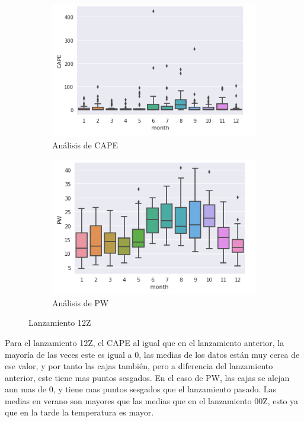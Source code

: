 \documentclass[12pt]{article}
\begin{document}
\begin{figure}[h!]
\begin{subfigure}{.55\textwidth}
  \centering
  \includegraphics[width=.8\linewidth]{CAPE_mes_12Z.png}
  \caption{Análisis de CAPE}
  \label{fig:sfig1}
\end{subfigure}
\begin{subfigure}{.55\textwidth}
  \centering
  \includegraphics[width=.8\linewidth]{PW_mes_12Z.png}
  \caption{Análisis de PW}
  \label{fig:sfig2}
\end{subfigure}
\caption{Lanzamiento 12Z}
\end{figure}

Para el lanzamiento 12Z, el CAPE al igual que en el lanzamiento anterior, la mayoría de las veces este es igual a 0, las medias de los datos están muy cerca de ese valor, y por tanto las cajas también, pero a diferencia del lanzamiento anterior, este tiene mas puntos sesgados. En el caso de PW, las cajas se alejan aun mas de 0, y tiene mas puntos sesgados que el lanzamiento pasado. Las medias en verano son mayores que las medias que en el lanzamiento 00Z, esto ya que en la tarde la temperatura es mayor. \\
\end{document}
